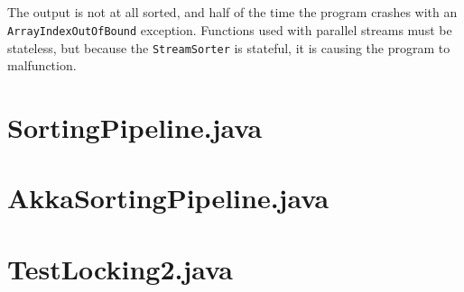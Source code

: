 \documentclass{ituhandin}
\begin{document}
\section{}
The output is not at all sorted, and half of the time the program crashes with an \texttt{ArrayIndexOutOfBound} exception. Functions used with parallel streams must be stateless, but because the \texttt{StreamSorter} is stateful, it is causing the program to malfunction.




\appendix
\chapter{SortingPipeline.java}


\chapter{AkkaSortingPipeline.java}


\chapter{TestLocking2.java}


\label{LastPage}
\end{document}
